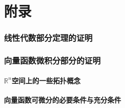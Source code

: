 \documentclass[zihao=-4,linespread=1.5,heading=true,a4paper,twoside]{ctexart}
\theoremstyle{definition}
\theoremstyle{plain}
\begin{document}


\newpage\part{附录}
\section{线性代数部分定理的证明}\label{sec:VI.1}


\section{向量函数微积分部分的证明}\label{sec:VI.2}
\subsection{$\mathbb{R}^n$空间上的一些拓扑概念}


\subsection{向量函数可微分的必要条件与充分条件}

\end{document}
